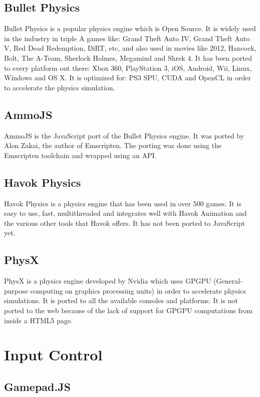 \subsection{Bullet Physics}

Bullet Physics is a popular physics engine which is Open Source. It is widely used in the industry in triple A games like: Grand Theft Auto IV, Grand Theft Auto V, Red Dead Redemption, DiRT, etc, and also used in movies like 2012, Hancock, Bolt, The A-Team, Sherlock Holmes, Megamind and Shrek 4. It has been ported to every platform out there: Xbox 360, PlayStation 3, iOS, Android, Wii, Linux, Windows and OS X. It is optimized for: PS3 SPU, CUDA and OpenCL in order to accelerate the physics simulation.

\subsection{AmmoJS}

AmmoJS is the JavaScript port of the Bullet Physics engine. It was ported by Alon Zakai, the author of Emscripten. The porting was done using the Emscripten toolchain and wrapped using an API.

\subsection{ Havok Physics}

Havok Physics is a physics engine that has been used in over 500 games. It is easy to use, fast, multithreaded and integrates well with Havok Animation and the various other tools that Havok offers. It has not been ported to JavaScript yet. 

\subsection{PhysX}

PhysX is a physics engine developed by Nvidia which uses GPGPU (General-purpose computing on graphics processing units) in order to accelerate physics simulations. It is ported to all the available consoles and platforms. It is not ported to the web because of the lack of support for GPGPU computations from inside a HTML5 page.

\section{Input Control}

\subsection{Gamepad.JS}

